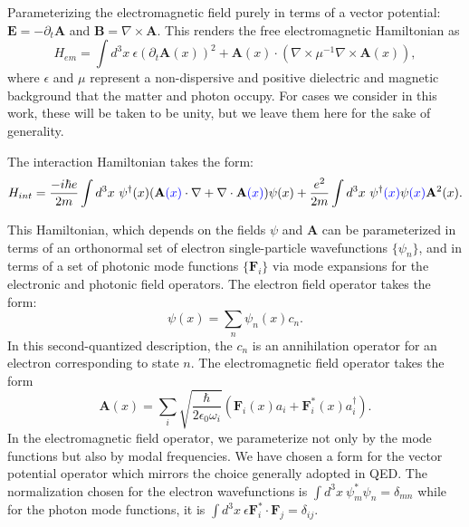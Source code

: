 \documentclass[aps,prb,onecolumn,
	groupedaddress,superscriptaddress,
	amsfonts,amssymb,amsmath,floatfix,
	citeautoscript]{revtex4-1}
\newcommand{\Jadd}[1]{\textcolor{blue}{#1}}
\begin{document}
Parameterizing the electromagnetic field purely in terms of a vector potential: $\mathbf{E} = -\partial_t\mathbf{A}$ and $\mathbf{B} = \nabla\times\mathbf{A}$. This renders the free electromagnetic Hamiltonian as
\begin{equation}
H_{em} = \int d^3x~ \epsilon (\partial_t \mathbf{A}(x))^2 + \mathbf{A}(x)\cdot(\nabla\times\mu^{-1}\nabla\times\mathbf{A}(x)),
\end{equation}
where $\epsilon$ and $\mu$ represent a non-dispersive and positive dielectric and magnetic background that the matter and photon occupy. For cases we consider in this work, these will be taken to be unity, but we leave them here for the sake of generality.

The interaction Hamiltonian takes the form:
\begin{equation}
H_{int} = \frac{-i\hbar e}{2m}\int d^3x ~\psi^{\dagger}(x)(\mathbf{A}\Jadd{(x)}\cdot\nabla +  \nabla \cdot \mathbf{A}\Jadd{(x)})\psi(x) + \frac{e^2}{2m}\int d^3x ~\psi^{\dagger}\Jadd{(x)}\psi\Jadd{(x)}\mathbf{A}^2(x).
\end{equation}

This Hamiltonian, which depends on the fields $\psi$ and $\mathbf{A}$ can be parameterized in terms of an orthonormal set of electron single-particle wavefunctions $\{\psi_n\}$, and in terms of a set of photonic mode functions $\{\mathbf{F}_i\}$ via mode expansions for the electronic and photonic field operators. The electron field operator takes the form:
\begin{equation}
\psi(x) = \sum_n \psi_n(x)c_n.
\end{equation}
In this second-quantized description, the $c_n$ is an annihilation operator for an electron corresponding to state $n$. The electromagnetic field operator takes the form
\begin{equation}
\mathbf{A}(x) = \sum_i\sqrt{\frac{\hbar}{2\epsilon_0\omega_i}} \left(\mathbf{F}_i(x)a_i+\mathbf{F}^*_i(x)a^{\dagger}_i\right).
\end{equation}
In the electromagnetic field operator, we parameterize not only by the mode functions but also by modal frequencies. We have chosen a form for the vector potential operator which mirrors the choice generally adopted in QED. The normalization chosen for the electron wavefunctions is $\int d^3x~ \psi_m^*\psi_n = \delta_{mn}$ while for the photon mode functions, it is $\int d^3x~\epsilon\mathbf{F}_i^*\cdot\mathbf{F}_j = \delta_{ij}.$
\end{document}

